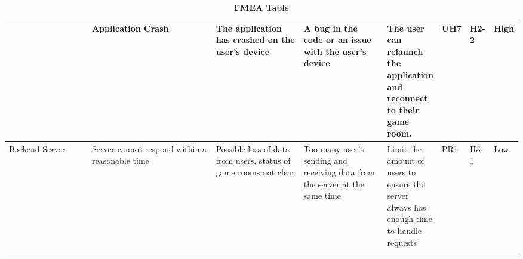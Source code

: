 \documentclass{article}
\begin{document}
\begin{table}[H]
\begin{adjustbox}{width=(/5)}
\begin{tabular}{|p{0.20\linewidth} | p{0.30\linewidth} | p{0.20\linewidth}|  p{0.20\linewidth}|  p{0.30\linewidth}|  p{0.07\linewidth}|  p{0.07\linewidth}|p{0.12\linewidth}| }
                                   &       Application Crash     &      The application has crashed on the user's device         &     A bug in the code or an issue with the user's device     &     The user can relaunch the application and reconnect to their game room.    &  UH7           &   H2-2          &   High               \\
          \hline
          Backend Server                   &    Server cannot respond within a reasonable time         &     Possible loss of data from users, status of game rooms not clear    &    Too many user's sending and receiving data from the server at the same time    &     Limit the amount of users to ensure the server always has enough time to handle requests      &   PR1          &  H3-1            &      Low            \\
                                   &                        &                             &                            &                             &             &              &                  \\
          \hline
    \end{tabular}
    \end{adjustbox}
    \caption{\bf FMEA Table}
    \label{tab:FMEA1}
\end{table}
\end{document}

